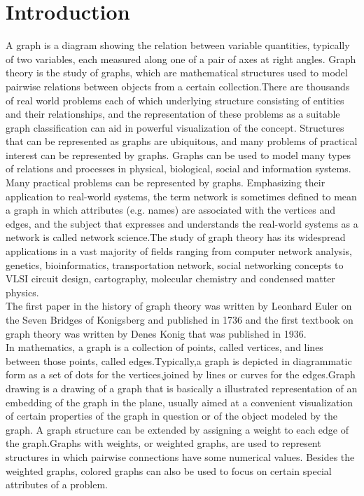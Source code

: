 \chapter{Introduction}\label{intro}


A graph is a diagram showing the relation between variable quantities, typically of two variables, each measured along one of a pair of axes at right angles. Graph theory is the study of graphs, which are mathematical structures used to model pairwise relations between objects from a certain collection.There are thousands of real world problems each of which underlying structure consisting of entities and their relationships, and the representation of these problems as a suitable graph classification can aid in powerful visualization of the concept. Structures that can be represented as graphs are ubiquitous, and many problems of practical interest can be represented by graphs. Graphs can be used to model many types of relations and processes in physical, biological, social and information systems. Many practical problems can be represented by graphs. Emphasizing their application to real-world systems, the term network is sometimes defined to mean a graph in which attributes (e.g. names) are associated with the vertices and edges, and the subject that expresses and understands the real-world systems as a network is called network science.The study of graph theory has its widespread applications in a vast majority of fields ranging from computer network analysis, genetics, bioinformatics, transportation network, social networking concepts to VLSI circuit design, cartography, molecular chemistry and condensed matter physics.
\\


The first paper in the history of graph theory was written by Leonhard Euler \cite{Biggs} on the Seven Bridges of Konigsberg and published in 1736 and the first textbook on graph theory was written by Denes  Konig \cite{Tutte} that was published in 1936.\\


In mathematics, a graph is a collection of points, called vertices, and lines between those points, called edges.Typically,a graph is depicted in diagrammatic form as a set of dots for the vertices,joined by lines or curves for the edges.Graph drawing is a drawing of a graph that is basically a illustrated representation of an embedding of the graph in the plane, usually aimed at a convenient visualization of certain properties of the graph in question or of the object modeled by the graph. A graph structure can be extended by assigning a weight to each edge of the graph.Graphs with weights, or weighted graphs, are used to represent structures in which pairwise connections have some numerical values. Besides the weighted graphs, colored graphs can also be used to focus on certain special attributes of a problem.
\\


